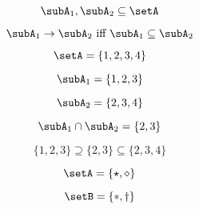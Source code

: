 {\begin{forslides}
\begin{equation}\label{eq:prod-slides-14}
\subA_1, \subA_2 \subseteq \setA
\end{equation}

\begin{equation}\label{eq:prod-slides-15}
\subA_1 \to \subA_2 \text{ iff } \subA_1 \subseteq \subA_2
\end{equation}


\begin{equation}\label{eq:prod-slides-16}
\setA = \{ 1, 2, 3, 4 \}
\end{equation}

\begin{equation}\label{eq:prod-slides-17}
\subA_1 = \{ 1, 2, 3 \}
\end{equation}

\begin{equation}\label{eq:prod-slides-18}
\subA_2 = \{2, 3, 4 \}
\end{equation}

\begin{equation}\label{eq:prod-slides-19}
\subA_1 \cap \subA_2 = \{2, 3 \}
\end{equation}

\begin{equation}\label{eq:prod-slides-20}
\{ 1, 2, 3 \} \supseteq \{2, 3 \} \subseteq \{2, 3, 4 \}
\end{equation}




\begin{equation}\label{eq:coprod-slides-1}
\setA=\{\star, \diamond\}
\end{equation}

\begin{equation}\label{eq:coprod-slides-2}
\setB=\{\ast, \dagger\}
\end{equation}




\end{forslides}
}


